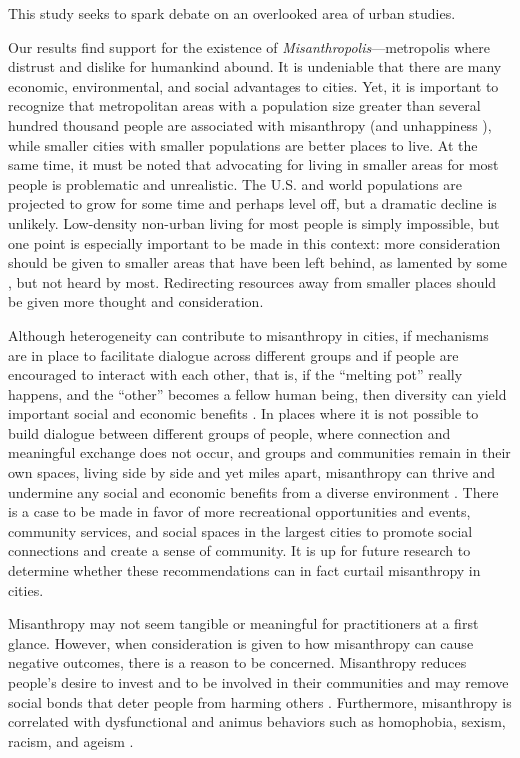 \documentclass[11pt, letterpaper]{article}
\begin{document}
\begin{spacing}{1.4}
This study seeks to spark debate on an overlooked area of urban studies. %

Our results find  support for the existence of
\emph{Misanthropolis}---metropolis where distrust and dislike for humankind
abound. It is undeniable that there are many economic, environmental, and social
advantages to cities. Yet, it is important to recognize that metropolitan areas
with a population size greater than several hundred thousand people are
associated with misanthropy (and unhappiness \citep{aok-ls_fisher16}), while
smaller cities with smaller populations are better places to live. At the same
time, it must be noted that advocating for living in smaller areas for most people is problematic and unrealistic. The U.S. and world populations are projected to grow for some time and perhaps level off, but a dramatic decline is unlikely. Low-density non-urban living for most people is simply impossible, but one point is especially important to be made in this context: more consideration should be given to smaller areas that have been left behind, as lamented by some \citep[e.g.,][]{fullerNYT17monD,hansonCityJournalautumn15}, but not heard by most. Redirecting resources away from smaller places should be given more thought and consideration.

Although heterogeneity can contribute to misanthropy in cities, if mechanisms
are in place to facilitate dialogue across different groups and if people are
encouraged to interact with each other, that is, if the ``melting pot'' really
happens, and the ``other'' becomes a fellow human being, then diversity can
yield important social and economic benefits \citep{rodriguez2019does}.  In
places where it is not possible to build dialogue between different groups of
people, where connection and meaningful exchange does not occur, and groups and
communities remain in their own spaces, living side by side and yet miles apart,
misanthropy can thrive and undermine any social and economic benefits from a
diverse environment \citep{rodriguez2019does}. There is a case to be made in favor of more recreational opportunities and events, community services, and social spaces in the largest cities to promote social connections and create a sense of community. It is up for future research to determine whether these recommendations can  in fact curtail misanthropy in cities.

Misanthropy may not seem tangible or meaningful for practitioners at a first
glance. However, when consideration is given to how misanthropy can cause
negative outcomes, there is a  reason to be concerned. Misanthropy reduces people's desire to invest and to be involved in their communities and may remove social bonds that deter people from harming others
 \citep{weaver2006,hirschi1993,fafchamps2006,walters2013}. Furthermore, misanthropy is correlated with dysfunctional and animus behaviors such as
 homophobia, sexism, racism, and ageism \citep{cattacin2006}. 
 

\end{spacing}
\end{document}

